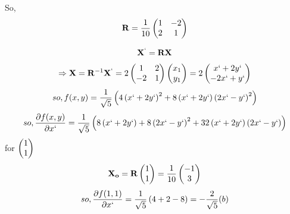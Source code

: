 \documentclass{beamer}
\numberwithin{equation}{section}
\begin{document}
So, 
\begin{align}
		\vec{R}=\frac{1}{10}\myvec{1&-2\\2&1}
\end{align}

\begin{align}
\vec{X}^` = \vec{R}\vec{X}
\end{align}
\begin{align}
	\Rightarrow	\vec{X} = \vec{R}^{-1}\vec{X}^` = 2\myvec{1&2\\-2&1}\myvec{x_1\\y_1} = 2\myvec{x`+2y`\\-2x`+y`}
\end{align}
\begin{align}
		so, f(x,y) = \frac{1}{\sqrt{5}}\brak{4\brak{x`+2y`}^2 + 8\brak{x`+2y`}\brak{2x`-y`}^2}
\end{align}
\begin{align}
		so, \frac{\partial f(x,y)}{\partial x`} = \frac{1}{\sqrt{5}}\brak{8\brak{x`+2y`} +8\brak{2x`-y`}^2+32\brak{x`+2y`}\brak{2x`-y`}}
\end{align}
for $\myvec{1\\1}$
\begin{align}
		\vec{X_o} = \vec{R}\myvec{1\\1} = \frac{1}{10}\myvec{-1\\3}
\end{align}
\begin{align}
		so, \frac{\partial f(1,1)}{\partial x`} = \frac{1}{\sqrt{5}}\brak{4+2-8} = -\frac{2}{\sqrt{5}} (b)
\end{align}
\end{document}
